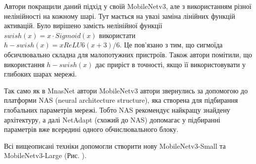 Автори покращили даний підхід у своїй MobileNetv3, але з використанням
різної нелінійності на кожному шарі. Тут мається на увазі заміна лінійних функцій активацій.
Було вирішено замість нелінійної функції $swish(x) = x·Sigmoid(x)$ використати
$h-swish(x) = xReLU6(x + 3)/6$. Це пов'язано з тим, що сигмоїда обсичлювально складна
для малопотужних пристроїв.
Також автори помітили, що використання $h-swish(x)$ дає приріст в точності, якщо її
використовувати у глибоких шарах мережі.

Так само як в MnasNet автори MobileNetv3 автори звернулись за допомогою до платформи NAS (neural
architecture structure), яка створена для  підбирання глобальних параметрів мережі.
Тобто NAS рекомендує найкращу знайдену архітектуру, а далі NetAdapt (схожий до NAS) допомагає у підбиранні
параметрів вже всередині одного обчислювального блоку.

Всі вищеописані техніки допомогли створити нову MobileNetv3-Small та MobileNetv3-Large (Рис. ).

